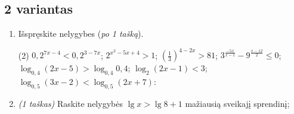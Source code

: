 \documentclass[a4paper]{article}
\begin{document}
\vspace*{6mm}

\subsection*{2 variantas}

\begin{enumerate}
      \item Išspręskite nelygybes (\textit{po 1 tašką}).

            \begin{tasks}[item-format={\normalfont}, after-item-skip=2mm](2)
                  \task $0,2^{7x-4} < 0,2^{3-7x}$;
                  \task $2^{x^2-5x+4} > 1$;
                  \task $(\frac{1}{3})^{4-2x} > 81$;
                  \task $3^{\frac{-5x}{x-1}}-9^{\frac{x-12}{2}} \leqslant 0$;
                  \task $\log_{0,4}(2x-5) > \log_{0,4}0,4$;
                  \task $\log_{2}(2x-1) < 3$;
                  \task $\log_{0,5}(3x-2) < \log_{0,5}(2x+7)$:
            \end{tasks}

      \item \textit{(1 taškas)} Raskite nelygybės $\lg{x}>\lg{8}+1$ mažiausią sveikajį sprendinį;

\end{enumerate}
\end{document}
